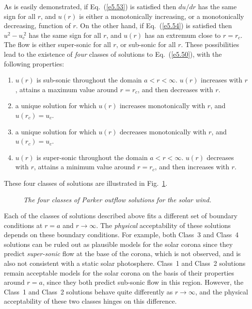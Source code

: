 As is easily demonstrated, if Eq.~(\ref{e5.53}) is satisfied then $du/dr$ has the
same sign for all $r$, and $u(r)$ is either a monotonically
increasing, or a monotonically decreasing, function of $r$. On the other
hand, if Eq.~(\ref{e5.54}) is satisfied then $u^2-u_c^{~2}$ has the same
sign for all $r$, and $u(r)$ has an extremum close to $r=r_c$. The flow
is either super-sonic for all $r$, or sub-sonic for all $r$. These
possibilities lead to the existence of {\em four}\/ classes of solutions
to Eq.~(\ref{e5.50}), with the 
following properties:
\begin{enumerate}
\item $u(r)$ is sub-sonic throughout the domain $a<r<\infty$. $u(r)$
increases with $r$, attains a maximum value around $r=r_c$, and then
decreases with $r$. 
\item a unique solution for which $u(r)$ increases monotonically 
with $r$, and $u(r_c) = u_c$. 
\item a unique solution for which $u(r)$ decreases monotonically 
with $r$, and $u(r_c) = u_c$. 
\item $u(r)$ is super-sonic throughout the domain $a<r<\infty$. 
 $u(r)$
decreases with $r$, attains a minimum value around $r=r_c$, and then
increases with $r$. 
\end{enumerate}
These four classes of solutions are illustrated in Fig.~\ref{f19}.

\begin{figure}
\epsfysize=4in
\centerline{}
\caption{\em The four classes of Parker outflow solutions for the solar wind.}\label{f19}
\end{figure}

Each of the classes of solutions described above fits a different
set of boundary conditions at $r=a$ and $r\rightarrow \infty$. The
{\em physical}\/ acceptability of these solutions depends on these
boundary conditions. For example, both Class~3 and Class~4 solutions can
be ruled out as plausible models for the solar corona since they predict
{\em super-sonic}\/ flow at the base of the corona, which is not observed, and is
also not consistent with a static solar photosphere. Class~1 and Class~2 solutions
remain acceptable models for the solar corona on the basis of their
properties around $r=a$, since they both predict sub-sonic flow in this region.
However, the Class~1 and Class~2 solutions behave quite differently
 as $r\rightarrow\infty$, and the physical acceptability of these two
classes hinges on this difference.

